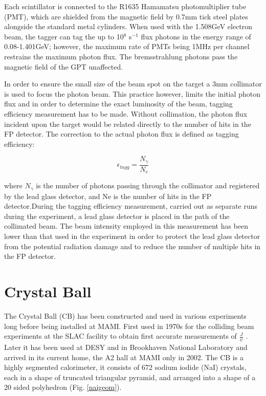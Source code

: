 \indent Each scintillator is connected to the R1635 Hamamatsu photomultiplier tube (PMT), which are shielded from the magnetic field by 0.7mm tick steel plates alongside the standard metal cylinders. When used with the 1.508GeV electron beam, the tagger can tag the up to 10$^{8}$ s$^{-1}$ flux photons in the energy range of 0.08-1.401GeV; however, the maximum rate of PMTs being 1MHz per channel restrains the maximum photon flux. The bremsstrahlung photons pass the magnetic field of the GPT unaffected.

\indent In order to ensure the small size of the beam spot on the target a 3mm collimator is used to focus the photon beam. This practice however, limits the initial photon flux and in order to determine the exact luminosity of the beam, tagging efficiency measurement has to be made. Without collimation, the photon flux incident upon the target would be related directly to the number of hits in the FP detector. The correction to the actual photon flux is defined as tagging efficiency:

\begin{equation}
\epsilon_{tagg}=\frac{N_{\gamma}}{N_{e}}
\end{equation}

\indent where $N_{\gamma}$ is the number of photons passing through the collimator and registered by the lead glass detector, and Ne is the number of hits in the FP detector.During the tagging efficiency measurement, carried out as separate runs during the experiment, a lead glass detector is placed in the path of the collimated beam. The beam intensity employed in this measurement has been lower than that used in the experiment in order to protect the lead glass detector from the potential radiation damage and to reduce the number of multiple hits in the FP detector.

\section{Crystal Ball}

\indent The Crystal Ball (CB) has been constructed and used in various experiments long before  being  installed  at  MAMI.  First  used  in  1970s  for  the  colliding  beam experiments at the SLAC facility to obtain first accurate measurements of $\frac{J}{\psi}$ \cite {oreglia}. Later it has been used at DESY and in Brookhaven National Laboratory and arrived in its current home, the A2 hall at MAMI only in 2002. The CB is a highly segmented calorimeter, it consists of 672 sodium iodide (NaI) crystals, each in a shape of truncated triangular pyramid, and arranged into a shape of a 20 sided polyhedron (Fig. \ref{naigeom}).

